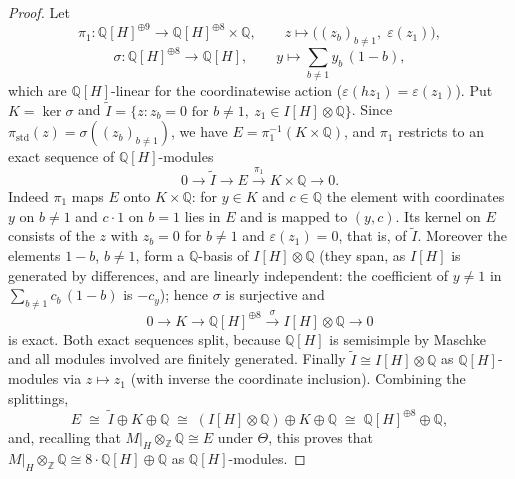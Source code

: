 \documentclass[12pt,a4paper]{article}
\newtheorem{proposition}[theorem]{Proposition}
\theoremstyle{definition}
\DeclareMathOperator{\Gal}{Gal}
\begin{document}
\begin{proof}
Let
\[
\pi_1 \colon \mathbb{Q}[H]^{\oplus 9} \longrightarrow
\mathbb{Q}[H]^{\oplus 8} \times \mathbb{Q}, \qquad
z \longmapsto \bigl((z_b)_{b \neq 1},\; \varepsilon(z_1)\bigr),
\]
\[
\sigma \colon \mathbb{Q}[H]^{\oplus 8} \longrightarrow \mathbb{Q}[H],
\qquad y \longmapsto \sum_{b \neq 1} y_b\,(1 - b) ,
\]
which are \(\mathbb{Q}[H]\)-linear for the coordinatewise action
(\(\varepsilon(h z_1) = \varepsilon(z_1)\)).  Put \(K = \ker \sigma\)
and \(\widetilde{I} = \{z : z_b = 0 \text{ for } b \neq 1,\ z_1 \in
I[H] \otimes \mathbb{Q}\}\).  Since \(\pi_{\mathrm{std}}(z) =
\sigma((z_b)_{b \neq 1})\), we have \(E = \pi_1^{-1}(K \times
\mathbb{Q})\), and \(\pi_1\) restricts to an exact sequence of
\(\mathbb{Q}[H]\)-modules
\[
0 \longrightarrow \widetilde{I} \longrightarrow E
\xrightarrow{\ \pi_1\ } K \times \mathbb{Q} \longrightarrow 0 .
\]
Indeed \(\pi_1\) maps \(E\) onto \(K \times \mathbb{Q}\): for \(y \in K\)
and \(c \in \mathbb{Q}\) the element with coordinates \(y\) on
\(b \neq 1\) and \(c \cdot 1\) on \(b = 1\) lies in \(E\) and is
mapped to \((y, c)\).  Its kernel on \(E\) consists of the \(z\) with
\(z_b = 0\) for \(b \neq 1\) and \(\varepsilon(z_1) = 0\), that is,
of \(\widetilde{I}\).  Moreover the elements \(1 - b\), \(b \neq 1\),
form a \(\mathbb{Q}\)-basis of \(I[H] \otimes \mathbb{Q}\) (they span, as
\(I[H]\) is generated by differences, and are linearly independent: the
coefficient of \(y \neq 1\) in \(\sum_{b \neq 1} c_b\,(1 - b)\)
is \(-c_y\)); hence \(\sigma\) is surjective and
\[
0 \longrightarrow K \longrightarrow \mathbb{Q}[H]^{\oplus 8}
\xrightarrow{\ \sigma\ } I[H] \otimes \mathbb{Q} \longrightarrow 0
\]
is exact.  Both exact sequences split, because \(\mathbb{Q}[H]\) is
semisimple by Maschke \cite[(3.14)]{CurtisReiner1981} and all modules
involved are finitely generated.  Finally \(\widetilde{I} \cong
I[H] \otimes \mathbb{Q}\) as \(\mathbb{Q}[H]\)-modules via \(z \mapsto
z_1\) (with inverse the coordinate inclusion).  Combining the
splittings,
\[
E \;\cong\; \widetilde{I} \oplus K \oplus \mathbb{Q}
\;\cong\; (I[H] \otimes \mathbb{Q}) \oplus K \oplus \mathbb{Q}
\;\cong\; \mathbb{Q}[H]^{\oplus 8} \oplus \mathbb{Q} ,
\]
and, recalling that \(M|_H \otimes_{\mathbb{Z}} \mathbb{Q} \cong E\)
under \(\Theta\), this proves that \(M|_H \otimes_{\mathbb{Z}}
\mathbb{Q} \cong 8 \cdot \mathbb{Q}[H] \oplus \mathbb{Q}\) as
\(\mathbb{Q}[H]\)-modules.
\end{proof}

%
\end{document}
